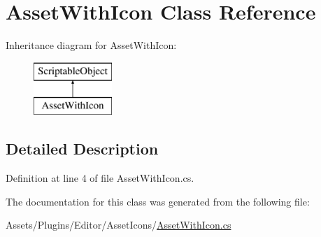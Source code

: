 \hypertarget{class_asset_with_icon}{}\section{Asset\+With\+Icon Class Reference}
\label{class_asset_with_icon}
Inheritance diagram for Asset\+With\+Icon\+:\begin{figure}[H]
\begin{center}
\leavevmode
\includegraphics[height=2.000000cm]{class_asset_with_icon}
\end{center}
\end{figure}


\subsection{Detailed Description}


Definition at line 4 of file Asset\+With\+Icon.\+cs.



The documentation for this class was generated from the following file\+:\begin{DoxyCompactItemize}
\item 
Assets/\+Plugins/\+Editor/\+Asset\+Icons/\mbox{\hyperlink{_asset_with_icon_8cs}{Asset\+With\+Icon.\+cs}}\end{DoxyCompactItemize}
